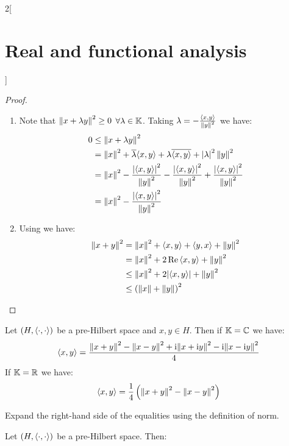 \documentclass[../../../main_math.tex]{subfiles}
\begin{document}
\begin{multicols}{2}[\section{Real and functional analysis}]
  \begin{proof}
    \begin{enumerate}
      \item Note that $\left\|x+\lambda y\right\|^2\geq 0$ $\forall\lambda\in\mathbb{K}$. Taking $\lambda = -\frac{{\left\langle x,y\right\rangle}}{\left\|y\right\|^2}$ we have:
            \begin{align*}
              0 & \leq \left\|x+\lambda y\right\|^2                                                                                                        \\
                & =\left\|x\right\|^2+\overline{\lambda}{\left\langle x,y\right\rangle}+\lambda\overline{{\left\langle x,y\right\rangle}}+\abs{\lambda}^2\left\|y\right\|^2                                \\
                & =\left\|x\right\|^2-\frac{\abs{{\left\langle x,y\right\rangle}}^2}{\left\|y\right\|^2}-\frac{\abs{{\left\langle x,y\right\rangle}}^2}{\left\|y\right\|^2}+\frac{\abs{{\left\langle x,y\right\rangle}}^2}{\left\|y\right\|^2} \\
                & =\left\|x\right\|^2-\frac{\abs{{\left\langle x,y\right\rangle}}^2}{\left\|y\right\|^2}
            \end{align*}
      \item Using  we have:
            \begin{align*}
              \norm{x+y}^2 & =\norm{x}^2+\dotp{x}{y}+\dotp{y}{x}+\norm{y}^2 \\
                           & =\norm{x}^2+2\Re\dotp{x}{y}+\norm{y}^2         \\
                           & \leq\norm{x}^2+2\abs{\dotp{x}{y}}+\norm{y}^2   \\
                           & \leq{(\norm{x} + \norm{y})}^2
            \end{align*}
    \end{enumerate}
  \end{proof}
  \begin{lemma}\label{RFA:polarization}
    Let $(H,{\left\langle\cdot,\cdot\right\rangle})$ be a pre-Hilbert space and $x,y\in H$. Then if $\mathbb{K}=\mathbb{C}$ we have:
    $${\left\langle x,y\right\rangle}=\frac{{\left\|x+y\right\|}^2-{\left\|x-y\right\|}^2+\mathrm{i}{\left\|x+\mathrm{i} y\right\|}^2-\mathrm{i}{\left\|x-\mathrm{i} y\right\|}^2}{4}$$
    If $\mathbb{K}=\mathbb{R}$ we have:
    $${\left\langle x,y\right\rangle}=\frac{1}{4}\left({\left\|x+y\right\|}^2-{\left\|x-y\right\|}^2\right)$$
  \end{lemma}
  \begin{sproof}
    Expand the right-hand side of the equalities using the definition of norm.
  \end{sproof}
  \begin{proposition}
    Let $(H,{\left\langle\cdot,\cdot\right\rangle})$ be a pre-Hilbert space. Then:
    \begin{itemize}

\end{itemize}
\end{proposition}
\end{multicols}
\end{document}
